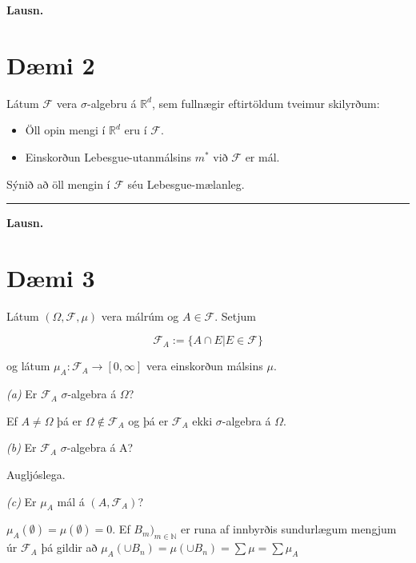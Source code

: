 \documentclass[]{book}
\begin{document}
\textbf{Lausn.}

\hypertarget{dmi-2-3}{%
\section*{Dæmi 2}\label{dmi-2-3}}

Látum \(\mathcal F\) vera \(\sigma\)-algebru á \(\mathbb R^d\), sem fullnægir eftirtöldum tveimur skilyrðum:

\begin{itemize}
\item
  Öll opin mengi í \(\mathbb R^d\) eru í \(\mathcal F\).
\item
  Einskorðun Lebesgue-utanmálsins \(m^*\) við \(\mathcal F\) er mál.
\end{itemize}

Sýnið að öll mengin í \(\mathcal F\) séu Lebesgue-mælanleg.

\begin{center}\rule{0.5\linewidth}{\linethickness}\end{center}

\textbf{Lausn.}

\hypertarget{dmi-3-3}{%
\section*{Dæmi 3}\label{dmi-3-3}}

Látum \((\Omega, \mathcal F, \mu)\) vera málrúm og \(A\in \mathcal F\). Setjum

\[
\mathcal F_A := \{A\cap E | E\in\mathcal F\}
\]

og látum \(\mu_A: \mathcal F_A \rightarrow [0,\infty]\) vera einskorðun málsins \(\mu\).

\emph{(a)} Er \(\mathcal F_A\) \(\sigma\)-algebra á \(\Omega\)?

Ef \(A \neq \Omega\) þá er \(\Omega \notin \mathcal F_A\) og þá er \(\mathcal F_A\) ekki \(\sigma\)-algebra á \(\Omega\).

\emph{(b)} Er \(\mathcal F_A\) \(\sigma\)-algebra á A?

Augljóslega.

\emph{(c)} Er \(\mu_A\) mál á \((A, \mathcal F_A)\)?

\(\mu_A(\emptyset) = \mu(\emptyset) = 0\). Ef \(B_m)_{m\in\mathbb N}\) er runa af innbyrðis sundurlægum mengjum úr \(\mathcal F_A\) þá gildir að \(\mu_A(\cup B_n) = \mu(\cup B_n) = \sum \mu = \sum \mu_A\)
\end{document}
